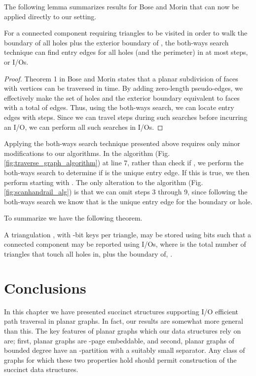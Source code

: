   The following lemma summarizes results for Bose and Morin that can now be 
  applied directly to our setting.

  \begin{lemma}\label{lem:bose_morin_time}
  For a connected component  requiring  triangles to be visited 
  in order to walk the boundary of all holes plus the exterior boundary of 
  , the both-ways search technique can find entry edges for all 
  holes (and the perimeter) in at most  steps, 
  or  I/Os. 
  \end{lemma}

  \begin{proof}
  Theorem 1 in Bose and Morin \cite{DBLP:conf/isaac/BoseM00} states that 
  a planar subdivision of faces with  vertices can be traversed in 
   time. 
  By adding zero-length pseudo-edges, we effectively make 
  the set of holes and the exterior boundary equivalent to faces with 
  a total of  edges. 
  Thus, using the both-ways search, we can locate entry edges with 
   steps. 
  Since we can travel  steps during such 
  searches before incurring an I/O, we can perform all such searches in 
   I/Os.
  \end{proof}

  Applying the both-ways search technique presented above requires only 
  minor modifications to our algorithms. 
  In the  algorithm (Fig. 
  \ref{fig:traverse_graph_algorithm}) at line 7, rather than check 
  if , we perform the both-ways search to determine 
  if  is the unique entry edge. 
  If this is true, we then perform  starting with . 
  The only alteration to the  algorithm 
  (Fig. \ref{fig:scanhandrail_alg}) is that we can omit steps 3 
  through 9, since following the both-ways search we know that  
  is the  unique entry edge for the boundary or hole.  

  To summarize we have the following theorem.

  \begin{theorem}\label{thm:conn_comp_without_add_storage}
  A triangulation , with -bit keys per triangle, 
  may be stored using  bits such 
  that a connected component  may be reported using 
   I/Os, where 
   is the total number of triangles that touch all holes in, 
  plus the boundary of, .
  \end{theorem}
  
  \section{Conclusions}\label{sec:graph_conclusions}
  
  In this chapter we have presented succinct structures supporting
  I/O efficient path traversal in planar graphs.
  In fact, our results are somewhat more general than this.
  The key features of planar graphs which our data structures rely
  on are; first, planar graphs are -page embeddable, and second, 
  planar graphs of bounded degree have an -partition with
  a suitably small separator. 
  Any class of graphs for which these two properties hold should 
  permit construction of the succinct data structures.

